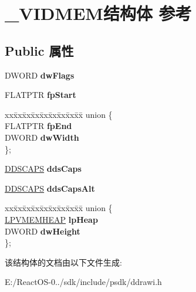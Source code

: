 \hypertarget{struct___v_i_d_m_e_m}{}\section{\+\_\+\+V\+I\+D\+M\+E\+M结构体 参考}
\label{struct___v_i_d_m_e_m}
\subsection*{Public 属性}
\begin{DoxyCompactItemize}
\item 
\mbox{\label{struct___v_i_d_m_e_m_a7bff8b63e5519bb767274dd3930bc550}} 
D\+W\+O\+RD {\bfseries dw\+Flags}
\item 
\mbox{\label{struct___v_i_d_m_e_m_a28c78378fb803bedef1981e922567e40}} 
F\+L\+A\+T\+P\+TR {\bfseries fp\+Start}
\item 
\mbox{\label{struct___v_i_d_m_e_m_adfcb3b18a3708ff52576e6367db8f8b4}} 
\begin{tabbing}
xx\=xx\=xx\=xx\=xx\=xx\=xx\=xx\=xx\=\kill
union \{\\
\>FLATPTR {\bfseries fpEnd}\\
\>DWORD {\bfseries dwWidth}\\
\}; \\

\end{tabbing}\item 
\mbox{\label{struct___v_i_d_m_e_m_a569b00d5b4f939c81aac8b2652c31227}} 
\hyperlink{struct___d_d_s_c_a_p_s}{D\+D\+S\+C\+A\+PS} {\bfseries dds\+Caps}
\item 
\mbox{\label{struct___v_i_d_m_e_m_acf3c391d928d77433121e6a38beb194e}} 
\hyperlink{struct___d_d_s_c_a_p_s}{D\+D\+S\+C\+A\+PS} {\bfseries dds\+Caps\+Alt}
\item 
\mbox{\label{struct___v_i_d_m_e_m_acba48ec6d143bc0e1da33b26b097a606}} 
\begin{tabbing}
xx\=xx\=xx\=xx\=xx\=xx\=xx\=xx\=xx\=\kill
union \{\\
\>\hyperlink{struct___v_m_e_m_h_e_a_p}{LPVMEMHEAP} {\bfseries lpHeap}\\
\>DWORD {\bfseries dwHeight}\\
\}; \\

\end{tabbing}\end{DoxyCompactItemize}


该结构体的文档由以下文件生成\+:\begin{DoxyCompactItemize}
\item 
E\+:/\+React\+O\+S-\/0../sdk/include/psdk/ddrawi.\+h\end{DoxyCompactItemize}
